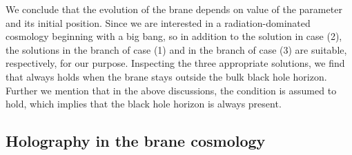 \documentclass[a4paper,12pt]{article}
\begin{document}
We conclude that the evolution of the brane depends on value of the
parameter \coordHE{} and its initial position. Since we
are interested in a radiation-dominated cosmology beginning with a
big bang, so in addition to the solution in case (2),  
the solutions in the branch \myHighlight{$x \in (0,x_+]$}\coordHE{} of  case (1) and in the branch 
\myHighlight{$x \in (0, x_-]$}\coordHE{}  of case (3) are suitable, respectively, for our purpose. 
Inspecting the three appropriate  solutions, we find that  \coordHE{} always 
holds when the brane stays outside the
bulk black hole horizon. Further we mention that in the above discussions, 
the condition \coordHE{} is assumed to hold, which implies that the
black hole horizon is always present.

 
\subsection{Holography in the brane cosmology}
\end{document}

